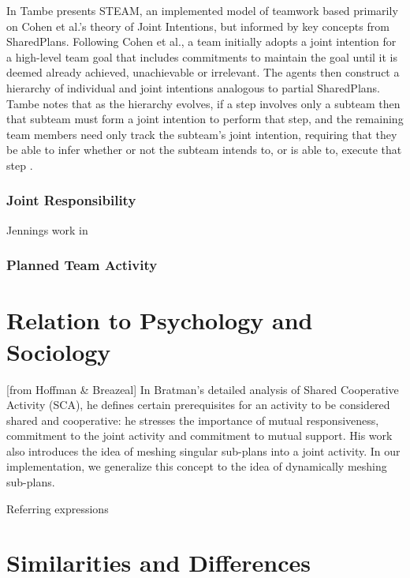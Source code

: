 \documentclass[11pt]{article}
\begin{document}
In \cite{tambe:flexible-teamwork} Tambe presents STEAM, an implemented model of
teamwork based primarily on Cohen et al.'s theory of Joint Intentions, but
informed by key concepts from SharedPlans. Following Cohen et al., a team
initially adopts a joint intention for a high-level team goal that includes
commitments to maintain the goal until it is deemed already achieved,
unachievable or irrelevant. The agents then construct a hierarchy of individual
and joint intentions analogous to partial SharedPlans. Tambe notes that as the
hierarchy evolves, if a step involves only a subteam then that subteam must form
a joint intention to perform that step, and the remaining team members need only
track the subteam's joint intention, requiring that they be able to infer
whether or not the subteam intends to, or is able to, execute that step
\cite{hunsberger:shared-plans-easier}.

\subsubsection{Joint Responsibility}

Jennings work in \cite{jennings:joint-intention-hybrid}

\subsubsection{Planned Team Activity}

\section{Relation to Psychology and Sociology}

[from Hoffman \& Breazeal] In Bratman’s detailed analysis of Shared Cooperative
Activity (SCA), he defines certain prerequisites for an activity to be
considered shared and cooperative: he stresses the importance of mutual
responsiveness, commitment to the joint activity and commitment to mutual
support. His work also introduces the idea of meshing singular sub-plans into a
joint activity. In our implementation, we generalize this concept to the idea of
dynamically meshing sub-plans.

Referring expressions \cite{heeman:model-collaboration-referring}

\section{Similarities and Differences}
\end{document}
